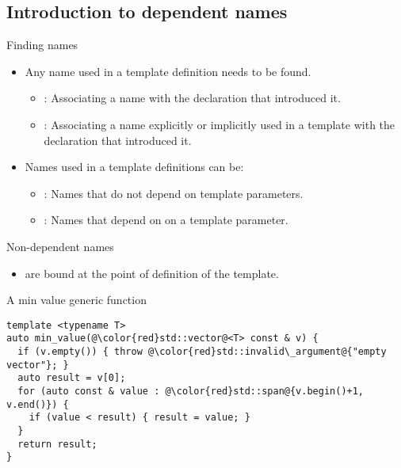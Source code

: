 \subsection{Introduction to dependent names}

\begin{frame}[t,fragile]{Finding names}
\begin{itemize}
  \item Any name used in a template definition needs to be found.
    \begin{itemize}
      \item {}: 
            Associating a name 
            with the declaration that introduced it.
      \item {}: 
            Associating a name explicitly or implicitly used in a template
            with the declaration that introduced it.
    \end{itemize}

  \item Names used in a template definitions can be:
    \begin{itemize}
      \item {}: 
            Names that do not depend on template parameters.

      \item {}:
            Names that depend on on a template parameter.
    \end{itemize}
\end{itemize}
\end{frame}

\begin{frame}[t,fragile]{Non-dependent names}
\begin{itemize}
  \item {} are bound at the point of definition
        of the template.
\end{itemize}

\begin{block}{A min value generic function}
\begin{lstlisting}[escapechar=@]
template <typename T>
auto min_value(@\color{red}std::vector@<T> const & v) {
  if (v.empty()) { throw @\color{red}std::invalid\_argument@{"empty vector"}; }
  auto result = v[0];
  for (auto const & value : @\color{red}std::span@{v.begin()+1, v.end()}) {
    if (value < result) { result = value; }
  }
  return result;
}
\end{lstlisting}
\end{block}
\end{frame}

